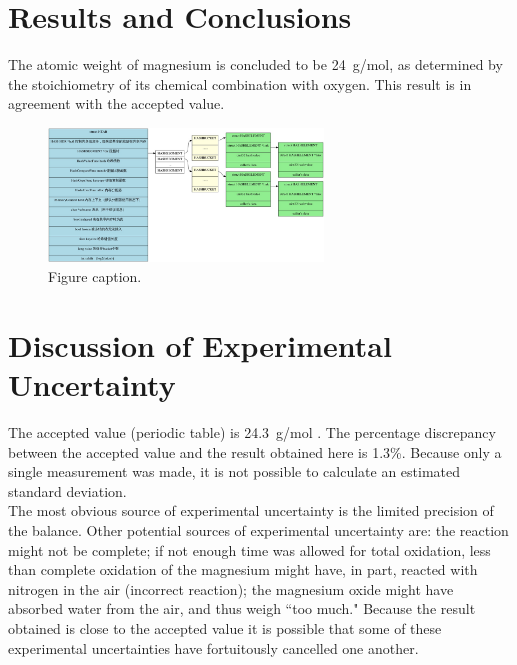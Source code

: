 \documentclass{article}
\begin{document}
\begin{CJK*}{UTF8}{gkai}

\section{Results and Conclusions}

The atomic weight of magnesium is concluded to be \SI{24}{g/mol}, as determined by the stoichiometry of its chemical combination with oxygen. This result is in agreement with the accepted value.

\begin{figure}[h]
\begin{center}
\includegraphics[width=0.65\textwidth]{hash.jpg} %
\caption{Figure caption.}
\end{center}
\end{figure}


\section{Discussion of Experimental Uncertainty}

The accepted value (periodic table) is \SI{24.3}{g/mol} \cite{Smith:2012qr}. The percentage discrepancy between the accepted value and the result obtained here is 1.3\%. Because only a single measurement was made, it is not possible to calculate an estimated standard deviation. \\

The most obvious source of experimental uncertainty is the limited precision of the balance. Other potential sources of experimental uncertainty are: the reaction might not be complete; if not enough time was allowed for total oxidation, less than complete oxidation of the magnesium might have, in part, reacted with nitrogen in the air (incorrect reaction); the magnesium oxide might have absorbed water from the air, and thus weigh ``too much." Because the result obtained is close to the accepted value it is possible that some of these experimental uncertainties have fortuitously cancelled one another.


\end{CJK*}
\end{document}
